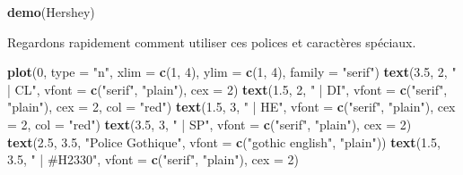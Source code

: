 \documentclass[]{article}
\newenvironment{Shaded}{\begin{snugshade}}{\end{snugshade}}
\newcommand{\DataTypeTok}[1]{\textcolor[rgb]{0.13,0.29,0.53}{#1}}
\newcommand{\DecValTok}[1]{\textcolor[rgb]{0.00,0.00,0.81}{#1}}
\newcommand{\FloatTok}[1]{\textcolor[rgb]{0.00,0.00,0.81}{#1}}
\newcommand{\KeywordTok}[1]{\textcolor[rgb]{0.13,0.29,0.53}{\textbf{#1}}}
\newcommand{\NormalTok}[1]{#1}
\newcommand{\StringTok}[1]{\textcolor[rgb]{0.31,0.60,0.02}{#1}}
\begin{document}
\begin{Shaded}
\begin{Highlighting}[]
\KeywordTok{demo}\NormalTok{(Hershey)}
\end{Highlighting}
\end{Shaded}

Regardons rapidement comment utiliser ces polices et caractères spéciaux.

\begin{Shaded}
\begin{Highlighting}[]
\KeywordTok{plot}\NormalTok{(}\DecValTok{0}\NormalTok{, }\DataTypeTok{type =} \StringTok{"n"}\NormalTok{, }\DataTypeTok{xlim =} \KeywordTok{c}\NormalTok{(}\DecValTok{1}\NormalTok{, }\DecValTok{4}\NormalTok{), }\DataTypeTok{ylim =} \KeywordTok{c}\NormalTok{(}\DecValTok{1}\NormalTok{, }\DecValTok{4}\NormalTok{), }\DataTypeTok{family =} \StringTok{"serif"}\NormalTok{)}
\KeywordTok{text}\NormalTok{(}\FloatTok{3.5}\NormalTok{, }\DecValTok{2}\NormalTok{, }\StringTok{" | CL"}\NormalTok{, }\DataTypeTok{vfont =} \KeywordTok{c}\NormalTok{(}\StringTok{"serif"}\NormalTok{, }\StringTok{"plain"}\NormalTok{), }\DataTypeTok{cex =} \DecValTok{2}\NormalTok{)}
\KeywordTok{text}\NormalTok{(}\FloatTok{1.5}\NormalTok{, }\DecValTok{2}\NormalTok{, }\StringTok{" | DI"}\NormalTok{, }\DataTypeTok{vfont =} \KeywordTok{c}\NormalTok{(}\StringTok{"serif"}\NormalTok{, }\StringTok{"plain"}\NormalTok{), }\DataTypeTok{cex =} \DecValTok{2}\NormalTok{, }\DataTypeTok{col =} \StringTok{"red"}\NormalTok{)}
\KeywordTok{text}\NormalTok{(}\FloatTok{1.5}\NormalTok{, }\DecValTok{3}\NormalTok{, }\StringTok{" | HE"}\NormalTok{, }\DataTypeTok{vfont =} \KeywordTok{c}\NormalTok{(}\StringTok{"serif"}\NormalTok{, }\StringTok{"plain"}\NormalTok{), }\DataTypeTok{cex =} \DecValTok{2}\NormalTok{, }\DataTypeTok{col =} \StringTok{"red"}\NormalTok{)}
\KeywordTok{text}\NormalTok{(}\FloatTok{3.5}\NormalTok{, }\DecValTok{3}\NormalTok{, }\StringTok{" | SP"}\NormalTok{, }\DataTypeTok{vfont =} \KeywordTok{c}\NormalTok{(}\StringTok{"serif"}\NormalTok{, }\StringTok{"plain"}\NormalTok{), }\DataTypeTok{cex =} \DecValTok{2}\NormalTok{)}
\KeywordTok{text}\NormalTok{(}\FloatTok{2.5}\NormalTok{, }\FloatTok{3.5}\NormalTok{, }\StringTok{"Police Gothique"}\NormalTok{,}
\DataTypeTok{vfont =} \KeywordTok{c}\NormalTok{(}\StringTok{"gothic english"}\NormalTok{, }\StringTok{"plain"}\NormalTok{))}
\KeywordTok{text}\NormalTok{(}\FloatTok{1.5}\NormalTok{, }\FloatTok{3.5}\NormalTok{, }\StringTok{" | #H2330"}\NormalTok{, }\DataTypeTok{vfont =} \KeywordTok{c}\NormalTok{(}\StringTok{"serif"}\NormalTok{, }\StringTok{"plain"}\NormalTok{), }\DataTypeTok{cex =} \DecValTok{2}\NormalTok{)}

\end{Highlighting}
\end{Shaded}
\end{document}
